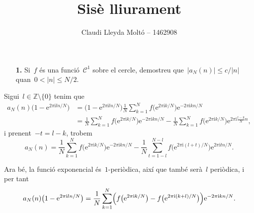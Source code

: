 \documentclass[a4paper]{article}
\title{Sisè lliurament}
\author{Claudi Lleyda Moltó -- 1462908}
\theoremstyle{plain}
\theoremstyle{definition}
\newcommand{\iu}{\mathrm{i}}
\newcommand{\e}{\mathrm{e}}
\providecommand{\uppi}{\pi}
\newcommand{\abs}[1]{\lvert{#1}\rvert}
\newcommand{\ZZ}{\mathbb{Z}}
\begin{document}
\maketitle

\begin{enumerate}
    \item[\textbf{1.}] Si~\(f\) és una funció~\(\mathcal{C}^{1}\) sobre el
        cercle, demostreu que~\(\abs{a_{N}(n)}\leq c/\abs{n}\)
        quan~\(0<\abs{n}\leq N/2\).
\end{enumerate}

Sigui~\(l\in\ZZ\setminus\{0\}\) tenim que
\begin{align*}
    a_{N}(n)
    \bigl(
        1 - \e^{2\uppi\iu ln/N}
    \bigr)
    &=
    \bigl(
        1 - \e^{2\uppi\iu ln/N}
    \bigr)
    \frac{1}{N}
    \sum_{k=1}^{N}
    f\bigl(
        \e^{2\uppi\iu k/N}
    \bigr)
    \e^{-2\uppi\iu kn/N} \\
    &=
    \frac{1}{N}
    \sum_{k=1}^{N}
    f\bigl(
        \e^{2\uppi\iu k/N}
    \bigr)
    \e^{-2\uppi\iu kn/N}
    -
    \frac{1}{N}
    \sum_{k=1}^{N}
    f\bigl(
        \e^{2\uppi\iu k/N}
    \bigr)
    \e^{2\uppi\iu\frac{l-k}{N}n},
\end{align*}
i prenent~\(-t=l-k\), trobem
\[
    a_{N}(n)
    =
    \frac{1}{N}
    \sum_{k=1}^{N}
    f\bigl(
        \e^{2\uppi\iu k/N}
    \bigr)
    \e^{-2\uppi\iu kn/N}
    -
    \frac{1}{N}
    \sum_{t=1-l}^{N-l}
    f\bigl(
        \e^{2\uppi\iu(l+t)/N}
    \bigr)
    \e^{2\uppi\iu tn/N}.
\]

Ara bé, la funció exponencial és~\(1\)-periòdica, així que també serà~\(l\)
periòdica, i per tant
\[
    a_{N}(n)
    \bigl(
        1 - \e^{2\uppi\iu ln/N}
    \bigr)
    =
    \frac{1}{N}
    \sum_{k=1}^{N}
    \Bigl(
        f\bigl(
            \e^{2\uppi\iu k/N}
        \bigr)
        -
        f\bigl(
            \e^{2\uppi\iu(k+l)/N}
        \bigr)
    \Bigr)
    \e^{-2\uppi\iu kn/N}.
\]
\end{document}
